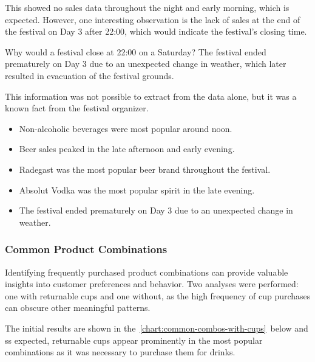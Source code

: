 This showed no sales data throughout the night and early morning, which is expected.
However, one interesting observation is the lack of sales at the end of the festival on Day 3 after 22:00, which would indicate the festival's closing time.

\begin{infobox}{Why would a festival close at 22:00 on a Saturday?}
	The festival ended prematurely on Day 3 due to an unexpected change in weather, which later resulted in evacuation of the festival grounds.
\end{infobox}

This information was not possible to extract from the data alone, but it was a known fact from the festival organizer.

\begin{keytakeaways}
	\begin{itemize}
		\item Non-alcoholic beverages were most popular around noon.
		\item Beer sales peaked in the late afternoon and early evening.
		\item Radegast was the most popular beer brand throughout the festival.
		\item Absolut Vodka was the most popular spirit in the late evening.
		\item The festival ended prematurely on Day 3 due to an unexpected change in weather.
	\end{itemize}
\end{keytakeaways}


\subsubsection{Common Product Combinations}
\label{subsubsec:analysis-common-combinations}


Identifying frequently purchased product combinations can provide valuable insights into customer preferences and behavior.
Two analyses were performed: one with returnable cups and one without, as the high frequency of cup purchases can obscure other meaningful patterns.

The initial results are shown in the~\autoref{chart:common-combos-with-cups}~below and ss expected, returnable cups appear prominently in the most popular combinations as it was necessary to purchase them for drinks.

